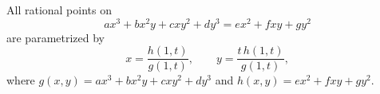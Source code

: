 \begin{proposition}
    All rational points on
\[
    ax^3+bx^2y+cxy^2+dy^3=ex^2+fxy+gy^2
\]
    are parametrized by
\[
    x=\frac{h(1,t)}{g(1,t)},\qquad y=\frac{t\,h(1,t)}{g(1,t)},
\]
    where $g(x,y)=ax^3+bx^2y+cxy^2+dy^3$ and $h(x,y)=ex^2+fxy+gy^2$.
\end{proposition}
